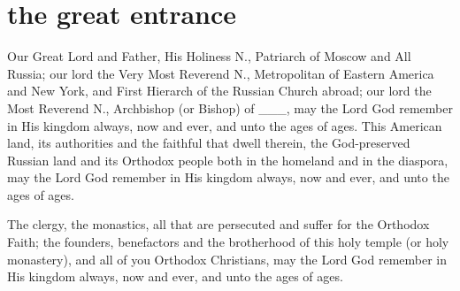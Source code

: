 \section{the great entrance}

\begin{liturgicaltext}
    \deacon  Our Great Lord and Father, His Holiness N., Patriarch of Moscow and All Russia; our lord the Very Most Reverend N., Metropolitan of Eastern America and New York, and First Hierarch of the Russian Church abroad; our lord the Most Reverend  N., Archbishop (or Bishop) of \_\_\_, may the Lord God remember in His kingdom always, now and ever, and unto the ages of ages.
    \priest This American land, its authorities and the faithful that dwell therein, the God-preserved Russian land and its Orthodox people both in the homeland and in the diaspora, may the Lord God remember in His kingdom always, now and ever, and unto the ages of ages.
    \item[] The clergy, the monastics, all that are persecuted and suffer for the Orthodox Faith; the founders, benefactors and the brotherhood of this holy temple (or holy monastery), and all of you Orthodox Christians, may the Lord God remember in His kingdom always, now and ever, and unto the ages of ages.
\end{liturgicaltext}